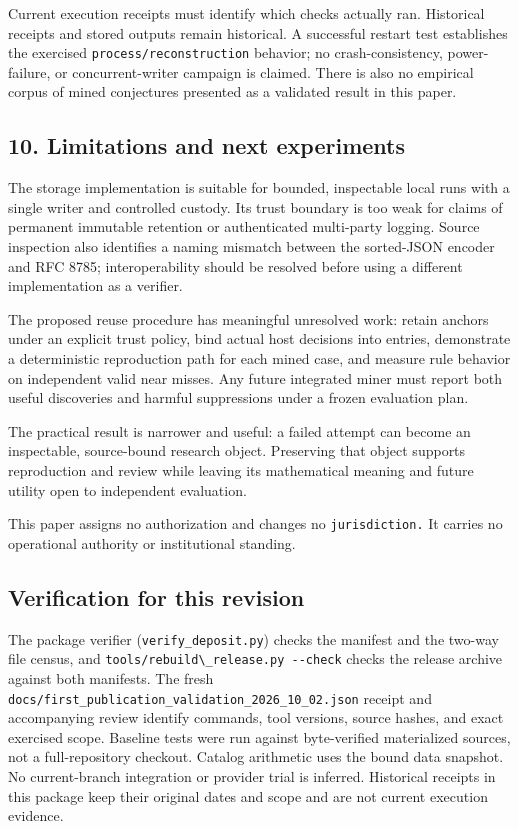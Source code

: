 \documentclass[
  11pt,
]{article}
\newcommand{\passthrough}[1]{#1}
\begin{document}
Current execution receipts must identify which checks actually ran.
Historical receipts and stored outputs remain historical. A successful
restart test establishes the exercised
\nolinkurl{process/reconstruction} behavior; no crash-consistency,
power-failure, or concurrent-writer campaign is claimed. There is also
no empirical corpus of mined conjectures presented as a validated result
in this paper.

\subsection{10. Limitations and next
experiments}\label{limitations-and-next-experiments}

The storage implementation is suitable for bounded, inspectable local
runs with a single writer and controlled custody. Its trust boundary is
too weak for claims of permanent immutable retention or authenticated
multi-party logging. Source inspection also identifies a naming mismatch
between the sorted-JSON encoder and RFC 8785; interoperability should be
resolved before using a different implementation as a verifier.

The proposed reuse procedure has meaningful unresolved work: retain
anchors under an explicit trust policy, bind actual host decisions into
entries, demonstrate a deterministic reproduction path for each mined
case, and measure rule behavior on independent valid near misses. Any
future integrated miner must report both useful discoveries and harmful
suppressions under a frozen evaluation plan.

The practical result is narrower and useful: a failed attempt can become
an inspectable, source-bound research object. Preserving that object
supports reproduction and review while leaving its mathematical meaning
and future utility open to independent evaluation.

This paper assigns no authorization and changes no
\nolinkurl{jurisdiction.} It carries no operational authority or
institutional standing.

\subsection{Verification for this
revision}\label{verification-for-this-revision}

The package verifier (\nolinkurl{verify_deposit.py}) checks the manifest
and the two-way file census, and
\passthrough{\lstinline!tools/rebuild\_release.py --check!} checks the
release archive against both manifests. The fresh
\nolinkurl{docs/first_publication_validation_2026_10_02.json} receipt
and accompanying review identify commands, tool versions, source hashes,
and exact exercised scope. Baseline tests were run against byte-verified
materialized sources, not a full-repository checkout. Catalog arithmetic
uses the bound data snapshot. No current-branch integration or provider
trial is inferred. Historical receipts in this package keep their
original dates and scope and are not current execution evidence.
\end{document}
